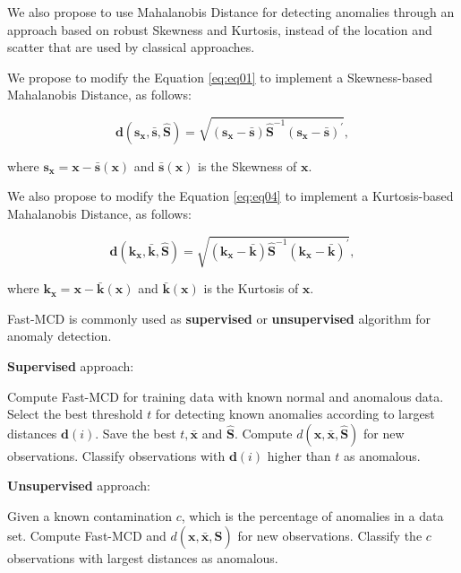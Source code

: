 \documentclass[review]{elsarticle}
\begin{document}
We also propose to use Mahalanobis Distance for detecting anomalies through an approach based on robust Skewness and Kurtosis, instead of the location and scatter that are used by classical approaches.

We propose to modify the Equation \ref{eq:eq01} to implement a Skewness-based Mahalanobis Distance, as follows:

\begin{equation}\label{eq:eq08}
	\boldsymbol{d}(\boldsymbol{s}_{\boldsymbol{x}}, \bar{\boldsymbol{s}}, \boldsymbol{\hat{S}}) = \sqrt{(\boldsymbol{s}_{\boldsymbol{x}} - \bar{\boldsymbol{s}}) \boldsymbol{\hat{S}}^{-1}(\boldsymbol{s}_{\boldsymbol{x}} - \bar{\boldsymbol{s}})^\prime}, 
\end{equation}

where $\boldsymbol{s}_{\boldsymbol{x}} = \boldsymbol{x} - \boldsymbol{\bar{s}}(\boldsymbol{x})$ and $\boldsymbol{\bar{s}}(\boldsymbol{x})$ is the Skewness of $\boldsymbol{x}$.

We also propose to modify the Equation \ref{eq:eq04} to implement a Kurtosis-based Mahalanobis Distance, as follows:

\begin{equation}\label{eq:eq09}
	\boldsymbol{d}(\boldsymbol{k}_{\boldsymbol{x}}, \bar{\boldsymbol{k}}, \boldsymbol{\hat{S}}) = \sqrt{(\boldsymbol{k}_{\boldsymbol{x}} - \bar{\boldsymbol{k}}) \boldsymbol{\hat{S}}^{-1}(\boldsymbol{k}_{\boldsymbol{x}} - \bar{\boldsymbol{k}})^\prime}, 
\end{equation}

where $\boldsymbol{k}_{\boldsymbol{x}} = \boldsymbol{x} - \boldsymbol{\bar{k}}(\boldsymbol{x})$ and $\boldsymbol{\bar{k}}(\boldsymbol{x})$ is the Kurtosis of $\boldsymbol{x}$.

Fast-MCD is commonly used as \textbf{supervised} or \textbf{unsupervised} algorithm for anomaly detection.
		
\textbf{Supervised} approach:

Compute Fast-MCD for training data with known normal and anomalous data.
Select the best threshold $t$ for detecting known anomalies according to largest distances $\boldsymbol{d}(i)$.
Save the best $t, \boldsymbol{\bar{x}}$ and $\boldsymbol{\hat{S}}$.
Compute $d(\boldsymbol{x},\bar{\boldsymbol{x}}, \boldsymbol{\hat{S}})$ for new observations.
Classify observations with $\boldsymbol{d}(i)$ higher than $t$ as anomalous.

\textbf{Unsupervised} approach:

Given a known contamination $c$, which is the percentage of anomalies in a data set.
Compute Fast-MCD and $d(\boldsymbol{x},\bar{\boldsymbol{x}}, \boldsymbol{\hat{S}})$ for new observations.
Classify the $c$ observations with largest distances as anomalous.
\end{document}

